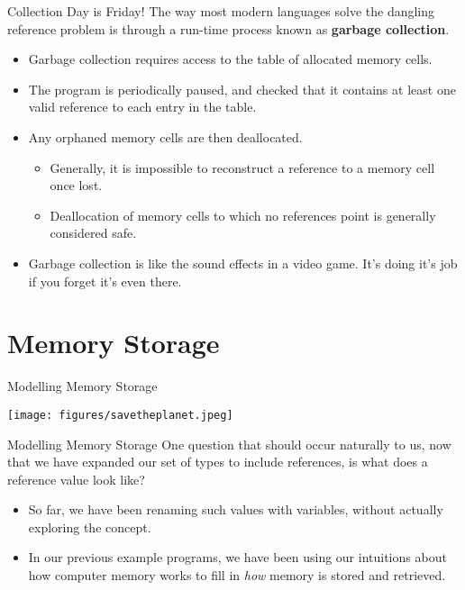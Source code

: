 \documentclass[11pt]{beamer}
\begin{document}
\begin{frame}[fragile=singleslide]{Collection Day is Friday!}
The way most modern languages solve the dangling reference problem is through a run-time process known as \textbf{garbage collection}.
\begin{itemize}
\item Garbage collection requires access to the table of allocated memory cells.
\item The program is periodically paused, and checked that it contains at least one valid reference to each entry in the table.  
\item Any orphaned memory cells are then deallocated.
\begin{itemize}
\item Generally, it is impossible to reconstruct a reference to a memory cell once lost.
\item Deallocation of memory cells to which no references point is generally considered safe.
\end{itemize}
\item Garbage collection is like the sound effects in a video game.  It's doing it's job if you forget it's even there.  
\end{itemize}
\end{frame}


\section[Storage]{Memory Storage}
\begin{frame}[fragile=singleslide]{Modelling Memory Storage}
\begin{center}
\texttt{[image: figures/savetheplanet.jpeg]}
\end{center}
\end{frame}


\begin{frame}[fragile=singleslide]{Modelling Memory Storage}
One question that should occur naturally to us, now that we have expanded our set of types to include references, is what does a reference value look like?  
\begin{itemize}
\item So far, we have been renaming such values with variables, without actually exploring the concept.
\item In our previous example programs, we have been using our intuitions about how computer memory works to fill in \emph{how} memory is stored and retrieved.  
\end{itemize}
\end{frame}
\end{document}
